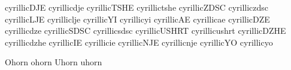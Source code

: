  cyrillicDJE    {}
 cyrillicdje    {}
 cyrillicTSHE   {}
 cyrillictshe   {}
 cyrillicZDSC   {}
 cyrilliczdsc   {}
 cyrillicLJE    {}
 cyrilliclje    {}
 cyrillicYI     {}
 cyrillicyi     {}
 cyrillicAE     {}
 cyrillicae     {}
 cyrillicDZE    {}
 cyrillicdze    {}
 cyrillicSDSC   {}
 cyrillicsdsc   {}
 cyrillicUSHRT  {}
 cyrillicushrt  {}
 cyrillicDZHE   {}
 cyrillicdzhe   {}
 cyrillicIE     {}
 cyrillicie     {}
 cyrillicNJE    {}
 cyrillicnje    {}
 cyrillicYO     {}
 cyrillicyo     {}


   Ohorn                {}
   ohorn                {}
   Uhorn                {}
   uhorn                {}

